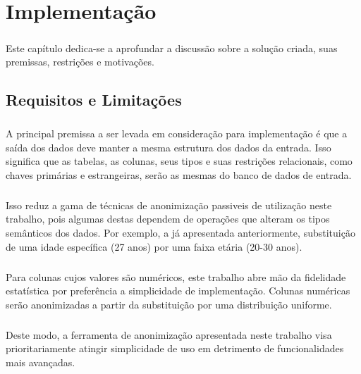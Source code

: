 \chapter{Implementação}
\label{cap4}

\paragraph{} Este capítulo dedica-se a aprofundar a discussão sobre a solução criada, suas premissas, restrições e motivações. 

\section{Requisitos e Limitações}

\paragraph{} A principal premissa a ser levada em consideração para implementação é que a saída dos dados deve manter a mesma estrutura dos dados da entrada. Isso significa que as tabelas, as colunas, seus tipos e suas restrições relacionais, como chaves primárias e estrangeiras, serão as mesmas do banco de dados de entrada.

\paragraph{} Isso reduz a gama de técnicas de anonimização passiveis de utilização neste trabalho, pois algumas destas dependem de operações que alteram os tipos semânticos dos dados. Por exemplo, a já apresentada anteriormente, substituição de uma idade específica (27 anos) por uma faixa etária (20-30 anos). 

\paragraph{} Para colunas cujos valores são numéricos, este trabalho abre mão da fidelidade estatística por preferência a simplicidade de implementação. Colunas numéricas serão anonimizadas a partir da substituição por uma distribuição uniforme.

\paragraph{} Deste modo, a ferramenta de anonimização apresentada neste trabalho visa prioritariamente atingir simplicidade de uso em detrimento de funcionalidades mais avançadas.

